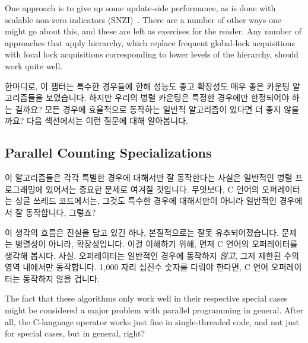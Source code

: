 \begin{lineref}
{	One approach is to give up some update-side performance, as is
	done with scalable non-zero indicators
	(SNZI)~\cite{FaithEllen:2007:SNZI}.
	There are a number of other ways one might go about this, and these
	are left as exercises for the reader.
	Any number of approaches that apply hierarchy, which replace
	frequent global-lock acquisitions with local lock acquisitions
	corresponding to lower levels of the hierarchy, should work quite well.
	\fi
} \QuickQuizEnd

한마디로, 이 챕터는 특수한 경우들에 한해 성능도 좋고 확장성도 매우 좋은 카운팅
알고리즘들을 보였습니다.
하지만 우리의 병렬 카운팅은 특정한 경우에만 한정되어야 하는 걸까요?
모든 경우에 효율적으로 동작하는 일반적 알고리즘이 있다면 더 좋지 않을까요?
다음 섹션에서는 이런 질문에 대해 알아봅니다.

\subsection{Parallel Counting Specializations}
\label{sec:count:Parallel Counting Specializations}

이 알고리즘들은 각각 특별한 경우에 대해서만 잘 동작한다는 사실은 일반적인
병렬 프로그래밍에 있어서는 중요한 문제로 여겨질 것입니다.
무엇보다, C 언어의 \co{++} 오퍼레이터는 싱글 쓰레드 코드에서는, 그것도 특수한
경우에 대해서만이 아니라 일반적인 경우에서 잘 동작합니다, 그렇죠?

이 생각의 흐름은 진실을 담고 있긴 하나, 본질적으로는 잘못 유추되어졌습니다.
문제는 병렬성이 아니라, 확장성입니다.
이걸 이해하기 위해, 먼저 C 언어의 \co{++} 오퍼레이터를 생각해 봅시다.
사실, \co{++} 오퍼레이터는 일반적인 경우에 동작하지 \emph{않고}, 그저 제한된
수의 영역 내에서만 동작합니다.
1,000 자리 십진수 숫자를 다뤄야 한다면, C 언어 \co{++} 오퍼레이터는 동작하지
않을 겁니다.

\iffalse
The fact that these algorithms only work well in their respective special
cases might be considered a major problem with parallel programming in
general.
After all, the C-language \co{++} operator works just fine in single-threaded
code, and not just for special cases, but in general, right?


\end{lineref}
